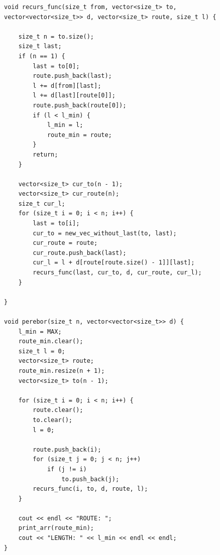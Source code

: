 \documentclass[12pt]{report}
\begin{document}
\begin{lstlisting}[label=some-code,caption=Реализация полного перебора]
void recurs_func(size_t from, vector<size_t> to, vector<vector<size_t>> d, vector<size_t> route, size_t l) {

	size_t n = to.size();
	size_t last;
	if (n == 1) {
		last = to[0];
		route.push_back(last);
		l += d[from][last];
		l += d[last][route[0]];
		route.push_back(route[0]);
		if (l < l_min) {
			l_min = l;
			route_min = route;
		}
		return;
	}

	vector<size_t> cur_to(n - 1);
	vector<size_t> cur_route(n);
	size_t cur_l;
	for (size_t i = 0; i < n; i++) {
		last = to[i];
		cur_to = new_vec_without_last(to, last);
		cur_route = route;
		cur_route.push_back(last);
		cur_l = l + d[route[route.size() - 1]][last];
		recurs_func(last, cur_to, d, cur_route, cur_l);
	}

}

void perebor(size_t n, vector<vector<size_t>> d) {
	l_min = MAX;
	route_min.clear();
	size_t l = 0;
	vector<size_t> route;
	route_min.resize(n + 1);
	vector<size_t> to(n - 1);

	for (size_t i = 0; i < n; i++) {
		route.clear();
		to.clear();
		l = 0;

		route.push_back(i);
		for (size_t j = 0; j < n; j++)
			if (j != i)
				to.push_back(j);
		recurs_func(i, to, d, route, l);
	}

	cout << endl << "ROUTE: ";
	print_arr(route_min);
	cout << "LENGTH: " << l_min << endl << endl;
}

\end{lstlisting}
\end{document}

